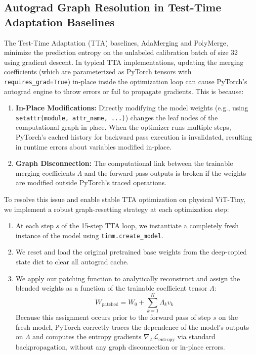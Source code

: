 \subsection{Autograd Graph Resolution in Test-Time Adaptation Baselines}
The Test-Time Adaptation (TTA) baselines, AdaMerging and PolyMerge, minimize the prediction entropy on the unlabeled calibration batch of size 32 using gradient descent.
In typical TTA implementations, updating the merging coefficients (which are parameterized as PyTorch tensors with \texttt{requires\_grad=True}) in-place inside the optimization loop can cause PyTorch's autograd engine to throw errors or fail to propagate gradients. This is because:
\begin{enumerate}
    \item \textbf{In-Place Modifications:} Directly modifying the model weights (e.g., using \texttt{setattr(module, attr\_name, ...)}) changes the leaf nodes of the computational graph in-place. When the optimizer runs multiple steps, PyTorch's cached history for backward pass execution is invalidated, resulting in runtime errors about variables modified in-place.
    \item \textbf{Graph Disconnection:} The computational link between the trainable merging coefficients $\Lambda$ and the forward pass outputs is broken if the weights are modified outside PyTorch's traced operations.
\end{enumerate}

To resolve this issue and enable stable TTA optimization on physical ViT-Tiny, we implement a robust graph-resetting strategy at each optimization step:
\begin{enumerate}
    \item At each step $s$ of the 15-step TTA loop, we instantiate a completely fresh instance of the model using \texttt{timm.create\_model}.
    \item We reset and load the original pretrained base weights from the deep-copied state dict to clear all autograd cache.
    \item We apply our patching function to analytically reconstruct and assign the blended weights as a function of the trainable coefficient tensor $\Lambda$:
        \begin{equation}
            W_{\text{patched}} = W_0 + \sum_{k=1}^K \Lambda_k v_k
        \end{equation}
        Because this assignment occurs prior to the forward pass of step $s$ on the fresh model, PyTorch correctly traces the dependence of the model's outputs on $\Lambda$ and computes the entropy gradients $\nabla_{\Lambda} \mathcal{L}_{\text{entropy}}$ via standard backpropagation, without any graph disconnection or in-place errors.
\end{enumerate}
